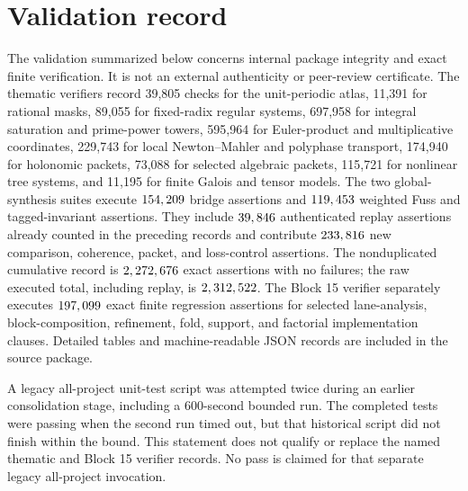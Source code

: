 \documentclass[11pt]{article}
\theoremstyle{definition}
\theoremstyle{remark}
\begin{document}


\clearpage


\clearpage


\clearpage
\section{Validation record}

The validation summarized below concerns internal package integrity and exact finite verification. It is not an external authenticity or peer-review certificate. The thematic verifiers record 39,805 checks for the unit-periodic atlas, 11,391 for rational masks, 89,055 for fixed-radix regular systems, 697,958 for integral saturation and prime-power towers, 595,964 for Euler-product and multiplicative coordinates, 229,743 for local Newton--Mahler and polyphase transport, 174,940 for holonomic packets, 73,088 for selected algebraic packets, 115,721 for nonlinear tree systems, and 11,195 for finite Galois and tensor models. The two global-synthesis suites execute \(154,209\) bridge assertions and \(119,453\) weighted Fuss and tagged-invariant assertions. They include \(39,846\) authenticated replay assertions already counted in the preceding records and contribute \(233,816\) new comparison, coherence, packet, and loss-control assertions. The nonduplicated cumulative record is \(2,272,676\) exact assertions with no failures; the raw executed total, including replay, is \(2,312,522\). The Block 15 verifier separately executes \(197,099\) exact finite regression assertions for selected lane-analysis, block-composition, refinement, fold, support, and factorial implementation clauses. Detailed tables and machine-readable JSON records are included in the source package.



A legacy all-project unit-test script was attempted twice during an earlier consolidation stage, including a 600-second bounded run. The completed tests were passing when the second run timed out, but that historical script did not finish within the bound. This statement does not qualify or replace the named thematic and Block 15 verifier records. No pass is claimed for that separate legacy all-project invocation.
\end{document}
